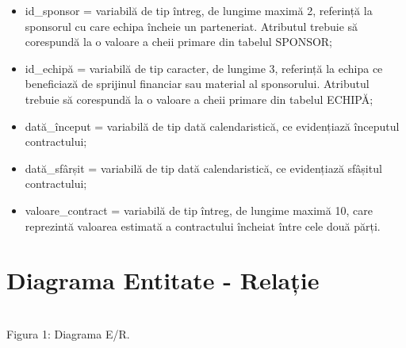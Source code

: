 \documentclass{article}
\begin{document}
\begin{spacing}{1.1}
	\begin{itemize}
		\item id\_sponsor = variabilă de tip întreg, de lungime maximă 2, referință la sponsorul cu care echipa încheie un parteneriat. Atributul trebuie să corespundă la o valoare a cheii primare din tabelul SPONSOR;
		
		\item id\_echipă = variabilă de tip caracter, de lungime 3, referință la echipa ce beneficiază de sprijinul financiar sau material al sponsorului. Atributul trebuie să corespundă la o valoare a cheii primare din tabelul ECHIPĂ;
		
		\item dată\_început = variabilă de tip dată calendaristică, ce evidențiază începutul contractului;
		
		\item dată\_sfârșit = variabilă de tip dată calendaristică, ce evidențiază sfâșitul contractului;		
		
		\item valoare\_contract = variabilă de tip întreg, de lungime maximă 10, care reprezintă valoarea estimată a contractului încheiat între cele două părți.
	\end{itemize}
	\end{spacing}
	
	\newpage
	
	\section{Diagrama Entitate - Relație}
	
	\vspace{1cm}
	\begin{center}
		
		\\[0.5cm]
		
		\small Figura 1: Diagrama E/R.
		
	\end{center}
	
\end{document}
